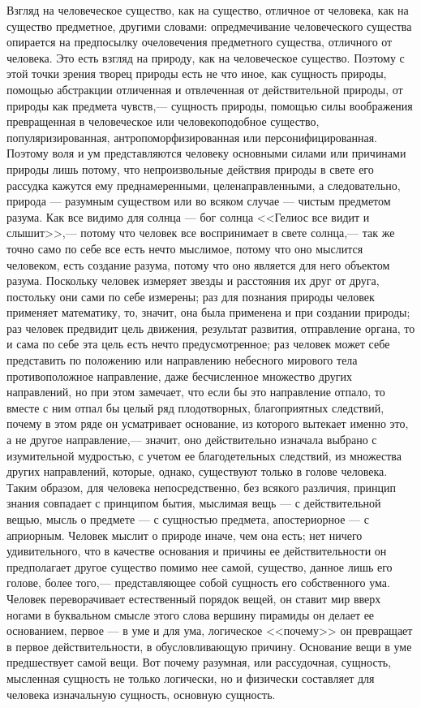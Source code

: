 \documentclass[12pt]{article}
\begin{document}
Взгляд на человеческое существо, как на существо, отличное от человека, как на существо предметное, другими словами: опредмечивание человеческого существа опирается на предпосылку очеловечения предметного существа, отличного от человека. Это есть взгляд на природу, как на человеческое существо. Поэтому с этой точки зрения творец природы есть не что иное, как сущность природы, помощью абстракции отличенная и отвлеченная от действительной природы, от природы как предмета чувств,--- сущность природы, помощью силы воображения превращенная в человеческое или человекоподобное существо, популяризированная, антропоморфизированная или персонифицированная. Поэтому воля и ум представляются человеку основными силами или причинами природы лишь потому, что непроизвольные действия природы в свете его рассудка кажутся ему преднамеренными, целенаправленными, а следовательно, природа --- разумным существом или во всяком случае --- чистым предметом разума. Как все видимо для солнца --- бог солнца <<Гелиос все видит и слышит>>,--- потому что человек все воспринимает в свете солнца,--- так же точно само по себе все есть нечто мыслимое, потому что оно мыслится человеком, есть создание разума, потому что оно является для него объектом разума. Поскольку человек измеряет звезды и расстояния их друг от друга, постольку они сами по себе измерены; раз для познания природы человек применяет математику, то, значит, она была применена и при создании природы; раз человек предвидит цель движения, результат развития, отправление органа, то и сама по себе эта цель есть нечто предусмотренное; раз человек может себе представить по положению или направлению небесного мирового тела противоположное направление, даже бесчисленное множество других направлений, но при этом замечает, что если бы это направление отпало, то вместе с ним отпал бы целый ряд плодотворных, благоприятных следствий, почему в этом ряде он усматривает основание, из которого вытекает именно это, а не другое направление,--- значит, оно действительно изначала выбрано с изумительной мудростью, с учетом ее благодетельных следствий, из множества других направлений, которые, однако, существуют только в голове человека. Таким образом, для человека непосредственно, без всякого различия, принцип знания совпадает с принципом бытия, мыслимая вещь --- с действительной вещью, мысль о предмете --- с сущностью предмета, апостериорное --- с априорным. Человек мыслит о природе иначе, чем она есть; нет ничего удивительного, что в качестве основания и причины ее действительности он предполагает другое существо помимо нее самой, существо, данное лишь его голове, более того,--- представляющее собой сущность его собственного ума. Человек переворачивает естественный порядок вещей, он ставит мир вверх ногами в буквальном смысле этого слова вершину пирамиды он делает ее основанием, первое --- в уме и для ума, логическое <<почему>> он превращает в первое действительности, в обусловливающую причину. Основание вещи в уме предшествует самой вещи. Вот почему разумная, или рассудочная, сущность, мысленная сущность не только логически, но и физически составляет для человека изначальную сущность, основную сущность.
\end{document}
